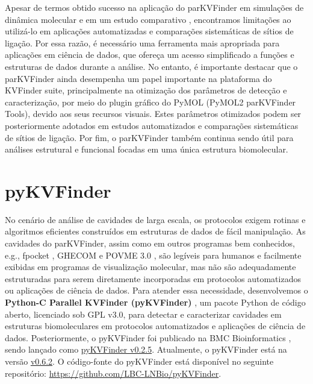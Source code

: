 \documentclass[Portugues]{phdquali}
\def\eg{e.g.\onedot}
\begin{document}
Apesar de termos obtido sucesso na aplicação do parKVFinder em simulações de dinâmica molecular \cite{guerra2020} e em um estudo comparativo \cite{ribeiro2021}, encontramos limitações ao utilizá-lo em aplicações automatizadas e comparações sistemáticas de sítios de ligação. Por essa razão, é necessário uma ferramenta mais apropriada para aplicações em ciência de dados, que ofereça um acesso simplificado a funções e estruturas de dados durante a análise. No entanto, é importante destacar que o parKVFinder ainda desempenha um papel importante na plataforma do KVFinder suite, principalmente na otimização dos parâmetros de detecção e caracterização, por meio do plugin gráfico do PyMOL (PyMOL2 parKVFinder Tools), devido aos seus recursos visuais. Estes parâmetros otimizados podem ser posteriormente adotados em estudos automatizados e comparações sistemáticas de sítios de ligação. Por fim, o parKVFinder também continua sendo útil para análises estrutural e funcional focadas em uma única estrutura biomolecular.


\section{pyKVFinder}

No cenário de análise de cavidades de larga escala, os protocolos exigem rotinas e algoritmos eficientes construídos em estruturas de dados de fácil manipulação. As cavidades do parKVFinder, assim como em outros programas bem conhecidos, \eg, fpocket \cite{fpocket}, GHECOM \cite{ghecom} e POVME 3.0 \cite{povme}, são legíveis para humanos e facilmente exibidas em programas de visualização molecular, mas não são adequadamente estruturadas para serem diretamente incorporadas em protocolos automatizados ou aplicações de ciência de dados. Para atender essa necessidade, desenvolvemos o \textbf{Python-C Parallel KVFinder (pyKVFinder)} \cite{guerra2021}, um pacote Python de código aberto, licenciado sob GPL v3.0, para detectar e caracterizar cavidades em estruturas biomoleculares em protocolos automatizados e aplicações de ciência de dados. Posteriormente, o pyKVFinder foi publicado na BMC Bioinformatics \cite{guerra2021}, sendo lançado como \href{https://github.com/LBC-LNBio/pyKVFinder/tree/v0.2.5}{pyKVFinder v0.2.5}. Atualmente, o pyKVFinder está na versão \href{https://github.com/LBC-LNBio/pyKVFinder/tree/v0.6.2}{v0.6.2}. O código-fonte do pyKVFinder está disponível no seguinte repositório: \url{https://github.com/LBC-LNBio/pyKVFinder}.
\end{document}
